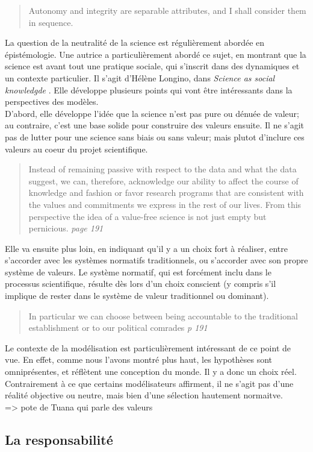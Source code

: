 \begin{quote}
    Autonomy and integrity are separable attributes, and I shall consider them in sequence.
\end{quote}

La question de la neutralité de la science est régulièrement abordée en épistémologie. Une autrice a particulièrement abordé ce sujet, en montrant que la science est avant tout une pratique sociale, qui s'inscrit dans des dynamiques et un contexte particulier. Il s'agit d'Hélène Longino, dans \emph{Science as social knowledgde} \cite{longino_science_1990}. Elle développe plusieurs points qui vont être intéressants dans la perspectives des modèles. \\

D'abord, elle développe l'idée que la science n'est pas pure ou dénuée de valeur; au contraire, c'est une base solide pour construire des valeurs ensuite. Il ne s'agit pas de lutter pour une science sans biais ou sans valeur; mais plutot d'inclure ces valeurs au coeur du projet scientifique. 

\begin{quote}
    Instead of remaining passive with respect to the data and what the data suggest, we can, therefore, acknowledge our ability to affect the course of knowledge and fashion or favor research programs that are consistent with the values and commitments we express in the rest of our lives. From this perspective the idea of a value-free science is not just empty but pernicious. \textit{page 191}
\end{quote}

Elle va ensuite plus loin, en indiquant qu'il y a un choix fort à réaliser, entre s'accorder avec les systèmes normatifs traditionnels, ou s'accorder avec son propre système de valeurs. Le système normatif, qui est forcément inclu dans le processus scientifique, résulte dès lors d'un choix conscient (y compris s'il implique de rester dans le système de valeur traditionnel ou dominant). 

\begin{quote}
    In particular we can choose between being accountable to the traditional establishment or to our political comrades \textit{p 191}
\end{quote}

Le contexte de la modélisation est particulièrement intéressant de ce point de vue. En effet, comme nous l'avons montré plus haut, les hypothèses sont omniprésentes, et réflètent une conception du monde. Il y a donc un choix réel. Contrairement à ce que certains modélisateurs affirment, il ne s'agit pas d'une réalité objective ou neutre, mais bien d'une sélection hautement normaitve. \\




\cite{helgeson_attention_2022} => pote de Tuana qui parle des valeurs

\subsection{La responsabilité}




